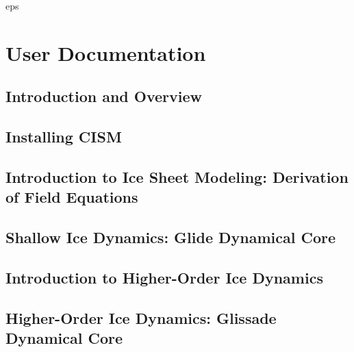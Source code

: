 \tableofcontents

{
         {eps} 
         {%
         } 

}
{}

\mainmatter
\part{User Documentation}

\chapter{Introduction and Overview}
\newcommand{\dir}{intro}


\chapter{Installing CISM}
\label{chp:install}
\renewcommand{\dir}{install}


\chapter{Introduction to Ice Sheet Modeling: Derivation of Field Equations}
\renewcommand{\dir}{modeling-intro}


\chapter{Shallow Ice Dynamics: Glide Dynamical Core}
\renewcommand{\dir}{shallow-ice}


\chapter{Introduction to Higher-Order Ice Dynamics}
\renewcommand{\dir}{higher-order}


\chapter{Higher-Order Ice Dynamics: Glissade Dynamical Core}
\renewcommand{\dir}{glissade}


%

